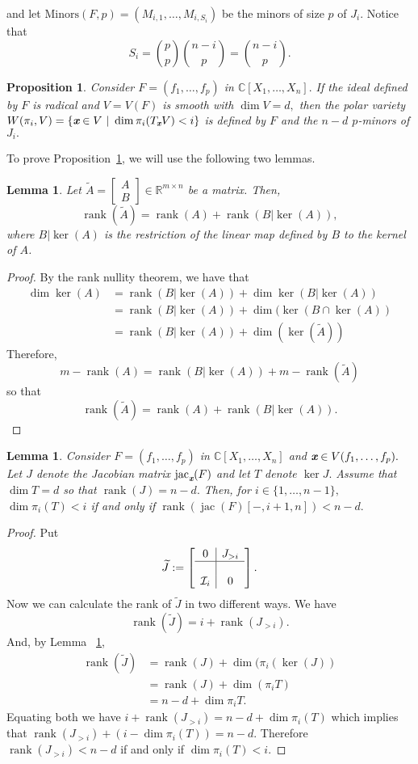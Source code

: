 \documentclass[a4paper]{article}
\def\xb{\textit{\textbf{x}}}
\def\jt{\widetilde{J}}
\def\At{\widetilde{A}}
\DeclareMathOperator{\jac}{jac}
\DeclareMathOperator{\rank}{rank}
\DeclareMathOperator{\rk}{rank}
\def\minors{\textrm{Minors}(F,p)}
\def\C{\mathbb{C}}
\def\bbm{\begin{bmatrix}}
\def\ebm{\end{bmatrix}}
\newtheorem{lemma}[theorem]{Lemma}
\newtheorem{prop}[theorem]{Proposition}
\begin{document}
and let $\minors = \left(M_{i,1},\hdots,M_{i,S_i}\right)$ be the minors of size $p$ of $J_i$. Notice that
\[
S_i = \binom{p}{p}\binom{n-i}{p}=\binom{n-i}{p}.
\]
%
\begin{prop}\label{prop:3.1}
Consider $F=(f_1,\hdots,f_p)$ in $\C[X_1,\hdots,X_n].$ If the ideal defined by $F$ is radical and $V = V(F)$ is smooth with $\dim V= d,$ then the polar variety $W(\pi_i,V) = \{\xb \in V~|~\dim \pi_i(T_{\xb}V) < i\}$ is defined by $F$ and the $n-d$ $p$-minors of $J_i.$ 
\end{prop}
%
\noindent 
To prove Proposition~\ref{prop:3.1}, we will use the following two lemmas.
%
\begin{lemma}\label{lem:3.2} 
Let $\widetilde{A} = \bbm A \\ B \ebm \in \mathbb{R}^{m\times n}$ be a matrix. Then, 
\[ 
\rank(\widetilde{A}) = 
\rank(A) + \rank(B|\ker(A)),
\]
where $B|\ker(A)$ is the restriction of the linear map defined by $B$ to the kernel of $A$. 
\end{lemma}
%
\begin{proof}
By the rank nullity theorem, we have that \begin{align*} 
\dim \ker(A) &= 
\rank(B|\ker(A)) +
\dim \ker(B| \ker(A)) \\
&= \rank(B|\ker(A)) +
\dim (\ker(B \cap \ker(A)) \\
&= \rank(B|\ker(A)) +
\dim (\ker(\widetilde{A}))
\end{align*}
Therefore, 
\[
m - \rank(A) = \rank(B|\ker(A)) + m - \rank(\At)
\]
so that 
\[
\rank(\At) = \rank(A) + \rank(B| \ker (A)).
\]
\end{proof}
%
%
\begin{lemma}\label{lem:3.3}
Consider $F=(f_1,\hdots,f_p)$ in $\C[X_1,\hdots,X_n]$ and $\xb \in V(f_1,\hdots,f_p).$ Let $J$ denote the Jacobian matrix $\jac_{\xb}( F)$ and let $T$ denote $\ker J.$ Assume that $\dim T = d$ so that $\rank(J) = n-d.$ Then, for $i \in \{1,\hdots,n-1\},$  $\dim\pi_i(T) < i$ if and only if $\rk (\jac(F)[-,i+1,n]) < n-d.$
\end{lemma} 
%
%
\begin{proof}
Put \[ \jt := 
\left[
\begin{array}{c|c}
0 & J_{>i}  \\
\hline \\
\mathcal{I}_i & 0  
\end{array}
\right].
\]
Now we can calculate the rank of $\jt$ in two different ways. We have \[\rank(\jt) = i + \rank(J_{>i}).\] And, by Lemma ~\ref{lem:3.2}, 
\begin{align*}
    \rank(\jt) &= \rank(J) + \dim(\pi_i(\ker(J)) \\ 
    &= \rank(J) + \dim(\pi_iT) \\
    &= n-d + \dim \pi_i T.
\end{align*}
Equating both we have $i + \rank(J_{>i}) = n-d + \dim\pi_i(T)$ which implies that $\rank(J_{>i}) + (i -\dim\pi_i (T) )= n-d$. Therefore $\rank(J_{>i}) < n-d$ if and only if $\dim \pi_i (T) < i.$
\end{proof}
\end{document}
